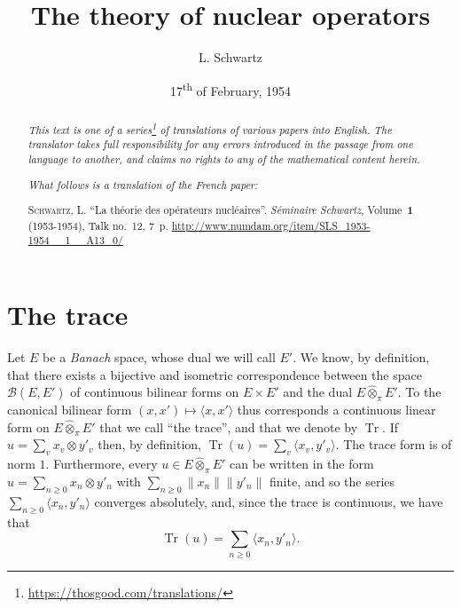 \documentclass{article}
\title{The theory of nuclear operators}
\author{L. Schwartz}
\date{17\textsuperscript{th} of February, 1954}
\theoremstyle{plain}
\theoremstyle{definition}
\newcommand{\BB}{\mathcal{B}}
\newcommand{\cprojotimes}{\widehat{\otimes}_\pi}
\newcommand{\tr}{\operatorname{Tr}}
\renewcommand{\geq}{\geqslant}
\newcommand{\oldpage}[1]{\marginpar{\footnotesize$\Big\vert$ \textit{p.~#1}}}
\begin{document}
\maketitle
\thispagestyle{fancy}

\renewcommand{\abstractname}{Translator's note.}

\begin{abstract}
  \renewcommand*{\thefootnote}{\fnsymbol{footnote}}
  \emph{This text is one of a series\footnote{\url{https://thosgood.com/translations/}} of translations of various papers into English.}
  \emph{The translator takes full responsibility for any errors introduced in the passage from one language to another, and claims no rights to any of the mathematical content herein.}
  
  \emph{What follows is a translation of the French paper:}

  \medskip\noindent
  \textsc{Schwartz, L.}
  ``La th\'{e}orie des op\'{e}rateurs nucl\'{e}aires''.
  \emph{S\'{e}minaire Schwartz}, Volume~\textbf{1} (1953-1954), Talk no.~12, 7~p.
  {\footnotesize\url{http://www.numdam.org/item/SLS_1953-1954__1__A13_0/}}
\end{abstract}

\setcounter{footnote}{0}

\tableofcontents
\bigskip



\section{The trace}
\label{section1}

\oldpage{1}

Let $E$ be a \emph{Banach} space, whose dual we will call $E'$.
We know, by definition, that there exists a bijective and isometric correspondence between the space $\BB(E,E')$ of continuous bilinear forms on $E\times E'$ and the dual $E\cprojotimes E'$.
To the canonical bilinear form $(x,x')\mapsto\langle x,x'\rangle$ thus corresponds a continuous linear form on $E\cprojotimes E'$ that we call ``the trace'', and that we denote by $\tr$.
If $u=\sum_v x_v\otimes y'_v$ then, by definition, $\tr(u)=\sum_v\langle x_v,y'_v\rangle$.
The trace form is of norm $1$.
Furthermore, every $u\in E\cprojotimes E'$ can be written in the form $u=\sum_{n\geq0}x_n\otimes y'_n$ with $\sum_{n\geq0}\|x_n\|\|y'_n\|$ finite, and so the series $\sum_{n\geq0}\langle x_n,y'_n\rangle$ converges absolutely, and, since the trace is continuous, we have that
\[
  \tr(u) = \sum_{n\geq0} \langle x_n, y'_n \rangle.
\]
\end{document}

